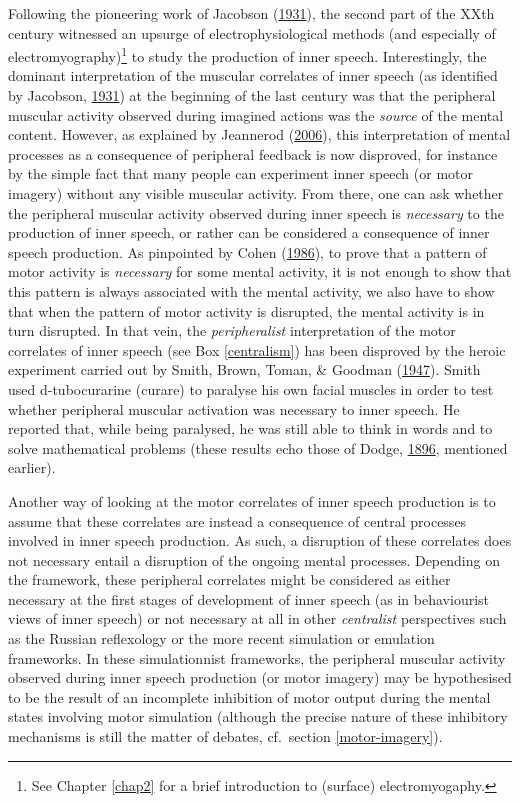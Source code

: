 \documentclass[a4paper,12pt,twoside,onecolumn,openright,final,oldfontcommands]{memoir}
\let\rmarkdownfootnote\footnote%
\def\footnote{\protect\rmarkdownfootnote}
\begin{document}
Following the pioneering work of Jacobson (\protect\hyperlink{ref-jacobson_electrical_1931}{1931}), the second part of the XXth century witnessed an upsurge of electrophysiological methods (and especially of electromyography)\footnote{See Chapter \ref{chap2} for a brief introduction to (surface) electromyogaphy.} to study the production of inner speech. Interestingly, the dominant interpretation of the muscular correlates of inner speech (as identified by Jacobson, \protect\hyperlink{ref-jacobson_electrical_1931}{1931}) at the beginning of the last century was that the peripheral muscular activity observed during imagined actions was the \emph{source} of the mental content. However, as explained by Jeannerod (\protect\hyperlink{ref-jeannerod_motor_2006}{2006}), this interpretation of mental processes as a consequence of peripheral feedback is now disproved, for instance by the simple fact that many people can experiment inner speech (or motor imagery) without any visible muscular activity. From there, one can ask whether the peripheral muscular activity observed during inner speech is \emph{necessary} to the production of inner speech, or rather can be considered a consequence of inner speech production. As pinpointed by Cohen (\protect\hyperlink{ref-cohen_motor_1986}{1986}), to prove that a pattern of motor activity is \emph{necessary} for some mental activity, it is not enough to show that this pattern is always associated with the mental activity, we also have to show that when the pattern of motor activity is disrupted, the mental activity is in turn disrupted. In that vein, the \emph{peripheralist} interpretation of the motor correlates of inner speech (see Box \ref{centralism}) has been disproved by the heroic experiment carried out by Smith, Brown, Toman, \& Goodman (\protect\hyperlink{ref-smith_lack_1947}{1947}). Smith used d-tubocurarine (curare) to paralyse his own facial muscles in order to test whether peripheral muscular activation was necessary to inner speech. He reported that, while being paralysed, he was still able to think in words and to solve mathematical problems (these results echo those of Dodge, \protect\hyperlink{ref-dodge_motorischen_1896}{1896}, mentioned earlier).

Another way of looking at the motor correlates of inner speech production is to assume that these correlates are instead a consequence of central processes involved in inner speech production. As such, a disruption of these correlates does not necessary entail a disruption of the ongoing mental processes. Depending on the framework, these peripheral correlates might be considered as either necessary at the first stages of development of inner speech (as in behaviourist views of inner speech) or not necessary at all in other \emph{centralist} perspectives such as the Russian reflexology or the more recent simulation or emulation frameworks. In these simulationnist frameworks, the peripheral muscular activity observed during inner speech production (or motor imagery) may be hypothesised to be the result of an incomplete inhibition of motor output during the mental states involving motor simulation (although the precise nature of these inhibitory mechanisms is still the matter of debates, cf.~section \ref{motor-imagery}).
\end{document}
